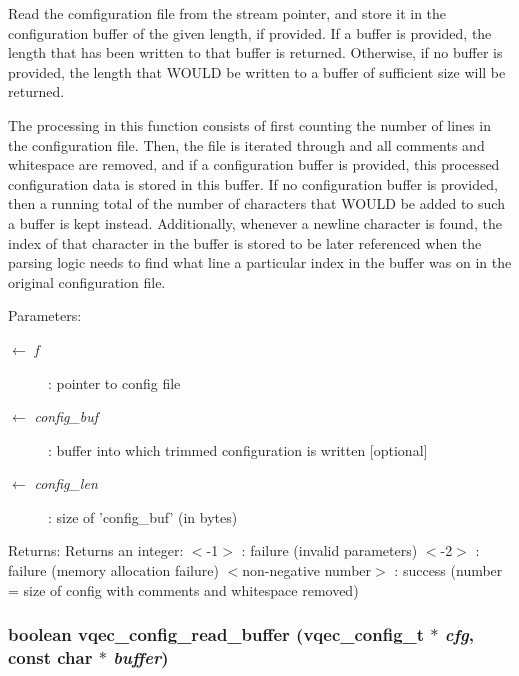 Read the comfiguration file from the stream pointer, and store it in the configuration buffer of the given length, if provided. If a buffer is provided, the length that has been written to that buffer is returned. Otherwise, if no buffer is provided, the length that WOULD be written to a buffer of sufficient size will be returned.

The processing in this function consists of first counting the number of lines in the configuration file. Then, the file is iterated through and all comments and whitespace are removed, and if a configuration buffer is provided, this processed configuration data is stored in this buffer. If no configuration buffer is provided, then a running total of the number of characters that WOULD be added to such a buffer is kept instead. Additionally, whenever a newline character is found, the index of that character in the buffer is stored to be later referenced when the parsing logic needs to find what line a particular index in the buffer was on in the original configuration file.

\begin{Desc}
\item[Parameters:]
\begin{description}
\item[\mbox{$\leftarrow$} {\em f}]: pointer to config file \item[\mbox{$\leftarrow$} {\em config\_\-buf}]: buffer into which trimmed configuration is written [optional] \item[\mbox{$\leftarrow$} {\em config\_\-len}]: size of 'config\_\-buf' (in bytes) \end{description}
\end{Desc}
\begin{Desc}
\item[Returns:]Returns an integer: $<$-1$>$ : failure (invalid parameters) $<$-2$>$ : failure (memory allocation failure) $<$non-negative number$>$ : success (number = size of config with comments and whitespace removed) \end{Desc}
\subsubsection{\setlength{\rightskip}{0pt plus 5cm}boolean vqec\_\-config\_\-read\_\-buffer (\bf{vqec\_\-config\_\-t} $\ast$ {\em cfg}, const char $\ast$ {\em buffer})}\label{vqec__config__parser_8c_82c73039ce3c5830f6f87ff3acb63d06}


